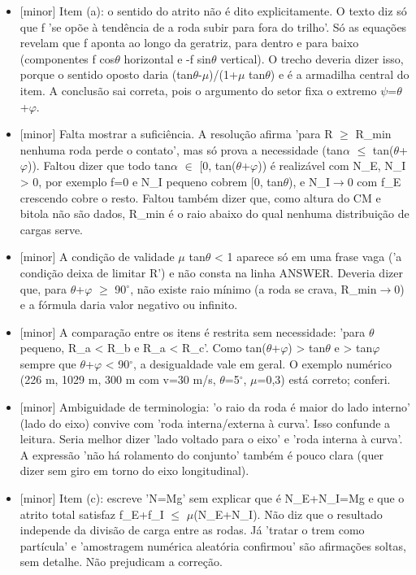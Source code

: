 \documentclass{article}%
\begin{document}
\begin{itemize}%
\item%
{[}minor{]} Item (a): o sentido do atrito não é dito explicitamente. O texto diz só que f 'se opõe à tendência de a roda subir para fora do trilho'. Só as equações revelam que f aponta ao longo da geratriz, para dentro e para baixo (componentes f cos$\theta$ horizontal e -f sin$\theta$ vertical). O trecho deveria dizer isso, porque o sentido oposto daria (tan$\theta$-$\mu$)/(1+$\mu$ tan$\theta$) e é a armadilha central do item. A conclusão sai correta, pois o argumento do setor fixa o extremo $\psi$=$\theta$+$\varphi$.%
\item%
{[}minor{]} Falta mostrar a suficiência. A resolução afirma 'para R $\geq$ R\_min nenhuma roda perde o contato', mas só prova a necessidade (tan$\alpha$ $\leq$ tan($\theta$+$\varphi$)). Faltou dizer que todo tan$\alpha$ $\in$ {[}0, tan($\theta$+$\varphi$)) é realizável com N\_E, N\_I > 0, por exemplo f=0 e N\_I pequeno cobrem {[}0, tan$\theta$), e N\_I$\to$0 com f\_E crescendo cobre o resto. Faltou também dizer que, como altura do CM e bitola não são dados, R\_min é o raio abaixo do qual nenhuma distribuição de cargas serve.%
\item%
{[}minor{]} A condição de validade $\mu$ tan$\theta$ < 1 aparece só em uma frase vaga ('a condição deixa de limitar R') e não consta na linha ANSWER. Deveria dizer que, para $\theta$+$\varphi$ $\geq$ 90$^\circ$, não existe raio mínimo (a roda se crava, R\_min$\to$0) e a fórmula daria valor negativo ou infinito.%
\item%
{[}minor{]} A comparação entre os itens é restrita sem necessidade: 'para $\theta$ pequeno, R\_a < R\_b e R\_a < R\_c'. Como tan($\theta$+$\varphi$) > tan$\theta$ e > tan$\varphi$ sempre que $\theta$+$\varphi$ < 90$^\circ$, a desigualdade vale em geral. O exemplo numérico (226 m, 1029 m, 300 m com v=30 m/s, $\theta$=5$^\circ$, $\mu$=0,3) está correto; conferi.%
\item%
{[}minor{]} Ambiguidade de terminologia: 'o raio da roda é maior do lado interno' (lado do eixo) convive com 'roda interna/externa à curva'. Isso confunde a leitura. Seria melhor dizer 'lado voltado para o eixo' e 'roda interna à curva'. A expressão 'não há rolamento do conjunto' também é pouco clara (quer dizer sem giro em torno do eixo longitudinal).%
\item%
{[}minor{]} Item (c): escreve 'N=Mg' sem explicar que é N\_E+N\_I=Mg e que o atrito total satisfaz f\_E+f\_I $\leq$ $\mu$(N\_E+N\_I). Não diz que o resultado independe da divisão de carga entre as rodas. Já 'tratar o trem como partícula' e 'amostragem numérica aleatória confirmou' são afirmações soltas, sem detalhe. Não prejudicam a correção.%
\end{itemize}%
\end{document}
